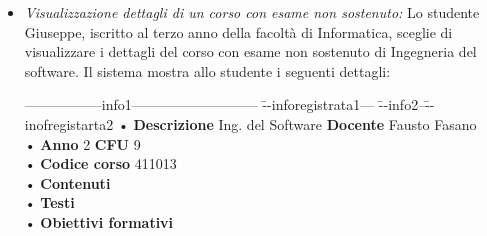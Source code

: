 \begin{itemize}
	\item \textit{Visualizzazione dettagli di un corso con esame non sostenuto:}
	Lo studente Giuseppe, iscritto al terzo anno della facoltà di Informatica, sceglie di visualizzare i dettagli del corso con esame non sostenuto di Ingegneria del software. Il sistema mostra allo studente i seguenti dettagli:
	\begin{tabbing}
		\hspace{1cm}-----------------info1--------------------------- \= --inforegistrata1--- \= --info2--\=--inofregistarta2 \kill
		\hspace{1cm} • \textbf{Descrizione} Ing. del Software \> \textbf{Docente} Fausto Fasano\\
		\hspace{1cm} • \textbf{Anno} 2 \> \textbf{CFU} 9  \\
		\hspace{1cm} • \textbf{Codice corso} 411013 \\
		\hspace{1cm} • \textbf{Contenuti} \\
		\hspace{1cm} • \textbf{Testi} \\
		\hspace{1cm} • \textbf{Obiettivi formativi} \\
	\end{tabbing}
\end{itemize}